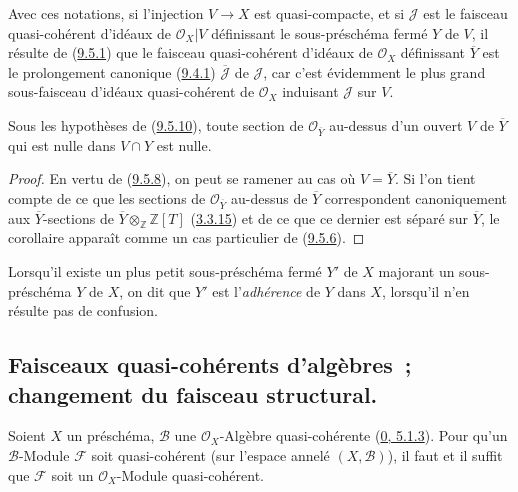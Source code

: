 Avec ces notations, si l'injection $V\to X$ est quasi-compacte, et si
$\mathscr{J}$ est le faisceau quasi-cohérent d'idéaux de
$\mathscr{O}_X|V$ définissant le sous-préschéma fermé $Y$ de $V$, il résulte
de (\hyperref[I.9.5.1-fr]{9.5.1}) que le faisceau quasi-cohérent d'idéaux de
$\mathscr{O}_X$ définissant $\overline{Y}$ est le prolongement canonique
(\hyperref[I.9.4.1-fr]{9.4.1}) $\overline{\mathscr{J}}$ de $\mathscr{J}$,
car c'est évidemment le plus grand sous-faisceau d'idéaux quasi-cohérent de
$\mathscr{O}_X$ induisant $\mathscr{J}$ sur $V$.
\begin{corollary}[9.5.11]
\label{I.9.5.11-fr}
Sous les hypothèses de (\hyperref[I.9.5.10-fr]{9.5.10}), toute section de
$\mathscr{O}_{\overline{Y}}$ au-dessus d'un ouvert $V$ de $\overline{Y}$
qui est nulle dans $V\cap Y$ est nulle.
\end{corollary}

\begin{proof}
En vertu de (\hyperref[I.9.5.8-fr]{9.5.8}), on peut se ramener au cas où
$V=\overline{Y}$. Si l'on tient compte de ce que les sections de
$\mathscr{O}_{\overline{Y}}$ au-dessus de $\overline{Y}$ correspondent
canoniquement aux $\overline{Y}$-sections de
$\overline{Y}\otimes_{\mathbb{Z}}\mathbb{Z}[T]$
(\hyperref[I.3.3.15-fr]{3.3.15}) et de ce que ce dernier est séparé sur
$\overline{Y}$, le corollaire apparaît comme un cas particulier de
(\hyperref[I.9.5.6-fr]{9.5.6}).
\end{proof}

Lorsqu'il existe un plus petit sous-préschéma fermé $Y'$ de $X$
majorant un sous-préschéma $Y$ de $X$, on dit que $Y'$ est
l'\emph{adhérence} de $Y$ dans $X$, lorsqu'il n'en résulte pas de
confusion.

\subsection{Faisceaux quasi-cohérents d'algèbres~; changement du faisceau
structural.}
\label{subsection:I.9.6-fr}

\begin{proposition}[9.6.1]
\label{I.9.6.1-fr}
Soient $X$ un préschéma, $\mathscr{B}$ une $\mathscr{O}_X$-Algèbre
quasi-cohérente (\hyperref[0.5.1.3-fr]{0, 5.1.3}). Pour qu'un
$\mathscr{B}$-Module $\mathscr{F}$ soit quasi-cohérent (sur l'espace
annelé $(X,\mathscr{B})$), il faut et il suffit que $\mathscr{F}$ soit un
$\mathscr{O}_X$-Module quasi-cohérent.
\end{proposition}

